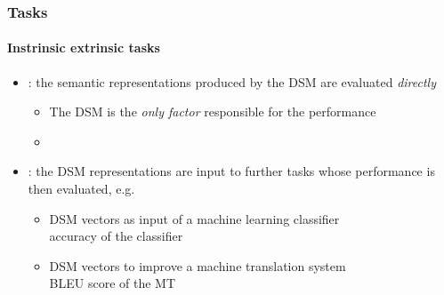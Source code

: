 \documentclass[t]{beamer} %
\begin{document}
\begin{frame}
  \frametitle{Tasks}
  \framesubtitle{Instrinsic \vs extrinsic tasks}
  \bigskip	

  \begin{itemize}
  \item {}: the semantic representations
    produced by the DSM are evaluated \textit{directly} 
    \begin{itemize}
    \item The DSM is the \textit{only factor} responsible for the performance
    \item[]
    \end{itemize}
  \item {}: the DSM representations are input to further tasks whose performance is then evaluated, e.g.
    \begin{itemize}
    \item DSM vectors as input of a machine learning classifier\\ \so accuracy of the classifier
    \item DSM vectors to improve a machine translation system\\ \so BLEU score of the MT
    \end{itemize}
  \end{itemize}
\end{frame}
\end{document}
